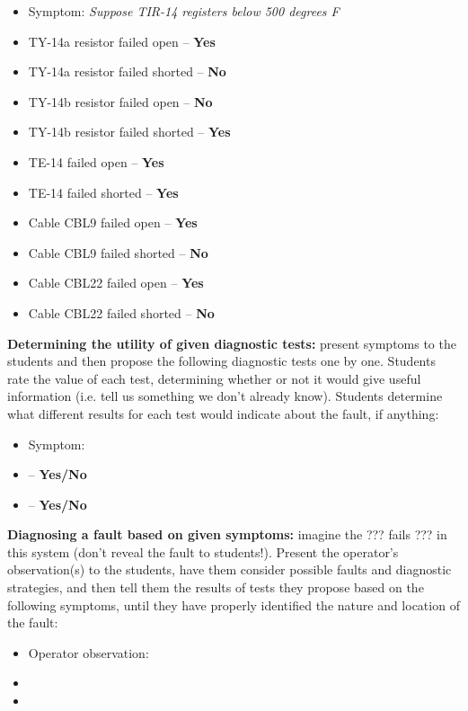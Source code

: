 \begin{itemize}
\item{} Symptom: {\it Suppose TIR-14 registers below 500 degrees F}
\item{} TY-14a resistor failed open -- {\bf Yes}
\item{} TY-14a resistor failed shorted -- {\bf No}
\item{} TY-14b resistor failed open -- {\bf No}
\item{} TY-14b resistor failed shorted -- {\bf Yes}
\item{} TE-14 failed open -- {\bf Yes}
\item{} TE-14 failed shorted -- {\bf Yes}
\item{} Cable CBL9 failed open -- {\bf Yes}
\item{} Cable CBL9 failed shorted -- {\bf No}
\item{} Cable CBL22 failed open -- {\bf Yes}
\item{} Cable CBL22 failed shorted -- {\bf No}
\end{itemize}


\vskip 10pt


\noindent
{\bf Determining the utility of given diagnostic tests:} present symptoms to the students and then propose the following diagnostic tests one by one.  Students rate the value of each test, determining whether or not it would give useful information (i.e. tell us something we don't already know).  Students determine what different results for each test would indicate about the fault, if anything:

\begin{itemize}
\item{} Symptom: {\it }
\item{}  -- {\bf Yes/No}
\item{}  -- {\bf Yes/No}
\end{itemize}


\vskip 10pt


\noindent
{\bf Diagnosing a fault based on given symptoms:} imagine the ??? fails ??? in this system (don't reveal the fault to students!).  Present the operator's observation(s) to the students, have them consider possible faults and diagnostic strategies, and then tell them the results of tests they propose based on the following symptoms, until they have properly identified the nature and location of the fault:

\begin{itemize}
\item{} Operator observation: {\it }
\item{} 
\item{} 
\end{itemize}



